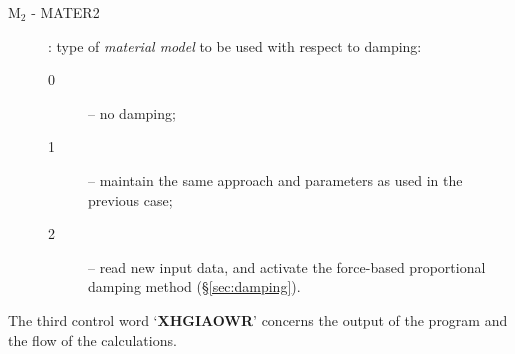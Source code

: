 \documentclass[12pt]{report}
\begin{document}
\begin{description}
\item[M$_2$ - MATER2] \label{m2-digit} : type of {\em material model\/} to
        be used with respect to damping:
\begin{description}
\item[0] -- no damping;
\item[1] -- maintain the same approach and parameters as used in the
        previous case;
\item[2] -- read new input data, and activate the force-based proportional
        damping method (\S \ref{sec:damping}).
\end{description}

\end{description}

The third control word `{\bf XHGIAOWR}' concerns the output of
the program and the flow of the calculations.
\end{document}
